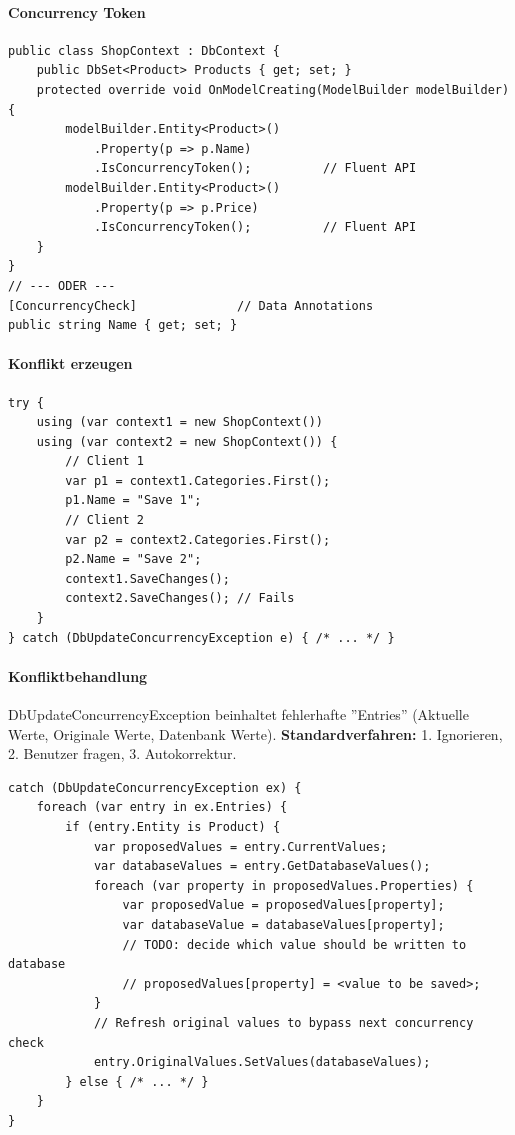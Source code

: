 \documentclass[
a4paper,
oneside,
10pt,
fleqn,
headsepline,
toc=listofnumbered, 
bibliography=totocnumbered]{scrartcl}
\begin{document}
\paragraph{Concurrency Token}
\begin{lstlisting}
public class ShopContext : DbContext {
    public DbSet<Product> Products { get; set; }
    protected override void OnModelCreating(ModelBuilder modelBuilder) {
        modelBuilder.Entity<Product>()
            .Property(p => p.Name)
            .IsConcurrencyToken();          // Fluent API
        modelBuilder.Entity<Product>()
            .Property(p => p.Price)
            .IsConcurrencyToken();          // Fluent API
    }
}
// --- ODER ---
[ConcurrencyCheck]              // Data Annotations
public string Name { get; set; }
\end{lstlisting}

\paragraph{Konflikt erzeugen}
\begin{lstlisting}
try {
    using (var context1 = new ShopContext())
    using (var context2 = new ShopContext()) {
        // Client 1
        var p1 = context1.Categories.First();
        p1.Name = "Save 1";
        // Client 2
        var p2 = context2.Categories.First();
        p2.Name = "Save 2";
        context1.SaveChanges();
        context2.SaveChanges(); // Fails
    }
} catch (DbUpdateConcurrencyException e) { /* ... */ }
\end{lstlisting}

\paragraph{Konfliktbehandlung}
DbUpdateConcurrencyException beinhaltet fehlerhafte ''Entries'' (Aktuelle Werte, Originale Werte, Datenbank Werte). \textbf{Standardverfahren:} 1. Ignorieren, 2. Benutzer fragen, 3. Autokorrektur.

\begin{lstlisting}
catch (DbUpdateConcurrencyException ex) {
    foreach (var entry in ex.Entries) {
        if (entry.Entity is Product) {
            var proposedValues = entry.CurrentValues;
            var databaseValues = entry.GetDatabaseValues();
            foreach (var property in proposedValues.Properties) {
                var proposedValue = proposedValues[property];
                var databaseValue = databaseValues[property];
                // TODO: decide which value should be written to database
                // proposedValues[property] = <value to be saved>;
            }
            // Refresh original values to bypass next concurrency check
            entry.OriginalValues.SetValues(databaseValues);
        } else { /* ... */ }
    }
}
\end{lstlisting}
\end{document}

